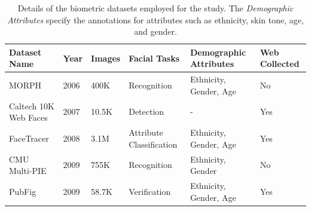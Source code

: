\documentclass[journal]{IEEEtran}
\begin{document}

\begin{table}[!t]
\caption{\label{tab:datasetdetails}Details of the biometric datasets employed for the study. The \textit{Demographic Attributes} specify the annotations for attributes such as ethnicity, skin tone, age, and gender.}
\centering
\scriptsize
\begin{tabular}{|p{}|C{0.025\textwidth}|C{0.09\textwidth}|p{0.19\textwidth}|p{0.2\textwidth}|C{0.06\textwidth}|}
\hline
\textbf{Dataset Name}                                                                    & \textbf{Year} & \textbf{Images}             & \textbf{Facial Tasks}                                                          & \textbf{Demographic Attributes}                     & \textbf{Web Collected} \\ \hline
MORPH \cite{ricanek2006morph}                                                           & 2006          & 400K                        & Recognition                                                                    & Ethnicity, Gender, Age                              & No                     \\
Caltech 10K Web Faces \cite{caltech10kfaces}                                            & 2007          & 10.5K                       & Detection                                                                      & -                                                   & Yes                    \\
FaceTracer \cite{kumar2008facetracer}                                                   & 2008          & 3.1M                        & Attribute Classification                                                       & Ethnicity, Gender, Age                              & Yes                    \\
CMU Multi-PIE \cite{ryan2009automated}                                                  & 2009          & 755K                        & Recognition                                                                    & Ethnicity, Gender                                   & No                     \\
PubFig \cite{kumar2009attribute}                                                        & 2009          & 58.7K                       & Verification                                                                   & Ethnicity, Gender, Age                              & Yes                    \\

\end{tabular}
\end{table}
\end{document}
